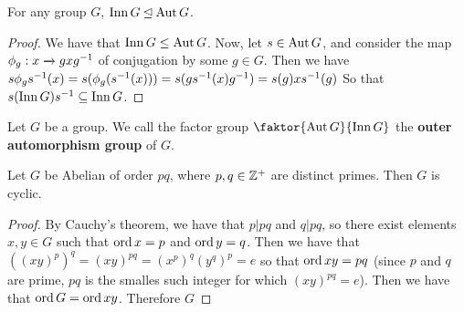 \begin{lemma}\label{lemma_4.4.7}
  For any group $G$,  $\operatorname{Inn}{G} \unlhd \operatorname{Aut}{G}$.
\end{lemma}
\begin{proof}
  We have that $\operatorname{Inn}{G} \leq \operatorname{Aut}{G}$. Now, let $s \in \operatorname{Aut}{G}$, and consider
  the map $\phi_g:x \xrightarrow{} gxg^{-1}$ of conjugation by some $g \in G$.
  Then we have $s\phi_gs^{-1}(x)=s(\phi_g(s^{-1}(x)))=s(gs^{-1}(x)g^{-1})=
  s(g)xs^{-1}(g)$ So that $s(\operatorname{Inn}{G})s^{-1} \subseteq \operatorname{Inn}{G}$.
\end{proof}

\begin{definition}
  Let $G$ be a group. We call the factor group  $\faktor{\Aut{G}}{\Inn{G}}$
  the \textbf{outer automorphism group} of $G$.
\end{definition}

\begin{lemma}\label{lemma_4.4.8}
  Let $G$ be Abelian of order $pq$, where $p,q \in \mathbb{Z}^+$ are distinct primes.
  Then $G$ is cyclic.
\end{lemma}
\begin{proof}
  By Cauchy's theorem, we have that $p|pq$ and  $q|pq$, so there exist
  elements  $x,y \in G$ such that  $\operatorname{ord}{x}=p$ and $\operatorname{ord}{y}=q$. Then we have
  that $((xy)^p)^q=(xy)^{pq}=(x^p)^q(y^q)^p=e$ so that $\operatorname{ord}{xy}=pq$ (since
  $p$ and $q$ are prime, $pq$ is the smalles such integer for which
  $(xy)^{pq}=e$). Then we have that $\operatorname{ord}{G}=\operatorname{ord}{xy}$. Therefore $G$
\end{proof}
